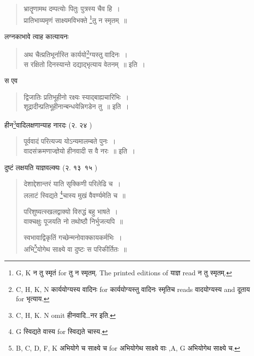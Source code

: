 \documentclass[11pt, openany]{book}
\begin{document}
\begin{quote}
{\vy भ्रातॄणामथ दम्पत्योः पितुः पुत्रस्य चैव हि~।\\
प्रातिभाव्यमृणं साक्ष्यमविभक्ते \renewcommand{\thefootnote}{3}\footnote{G, K न तु स्मृतं for तु न स्मृतम्. The printed editions of याज्ञ read न तु स्मृतम्.}तु न स्मृतम्~॥}
\end{quote}

लग्नकाभावे त्वाह कात्यायनः

\begin{quote}
{\vy अथ चैत्प्रतिभूर्नास्ति कार्ययो\renewcommand{\thefootnote}{4}\footnote{C, H, K, N कार्ययोग्यस्य वादिनः for कार्ययोग्यस्तु वादिनः स्मृतिच reads वादयोग्यस्य and दूताय for भृत्याय.}ग्यस्तु वादिनः~।\\
स रक्षितो दिनस्यान्ते दद्याद्भृत्याय वेतनम्~॥} इति~।
\end{quote}

स एव 

\begin{quote}
{\vy द्विजातिः प्रतिभूहीनो रक्ष्यः स्याद्बाह्यचारिभिः~।\\
शूद्रादीन्प्रतिभूहीनान्बन्धयेन्निगडेन तु~॥} इति~।
\end{quote}

हीन\renewcommand{\thefootnote}{5}\footnote{C, H, K. N omit हीनवादि\ldots नर इति.}वादिलक्षणान्याह नारदः (२. २४ )

\begin{quote}
{\vy पूर्ववादं परित्यज्य योऽन्यमालम्बते पुनः~।\\
वादसंक्रमणाज्ज्ञेयो हीनवादी स वै नरः~॥} इति~।
\end{quote}

\newpage
{}

दुष्टं लक्षयति याज्ञवल्क्यः (२. १३\textendash\ १५ ) 

\begin{quote}
{\vy देशाद्देशान्तरं याति सृक्किणी परिलेढि च~।\\
ललाटं स्विद्यते \renewcommand{\thefootnote}{1}\footnote{G स्विद्यते वास्य for स्विद्यते चास्य.}चास्य मुखं वैवर्ण्यमेति च~॥

परिशुष्यत्स्खलद्वाक्यो विरुद्धं बहु भाषते~।\\
वाक्चक्षुः पूजयति नो तथोष्ठौ निर्भुजत्यपि~॥

स्वभावाद्विकृतिं गच्छेन्मनोवाक्कायकर्मभिः~।\\
अभि\renewcommand{\thefootnote}{2}\footnote{B, C, D, F, K अभियोगे च साक्ष्ये च for अभियोगेथ साक्ष्ये वाः ,A, G अभियोगेथ साक्ष्ये च.}योगेथ साक्ष्ये वा दुष्टः स परिकीर्तितः~॥}
\end{quote}
\end{document}
